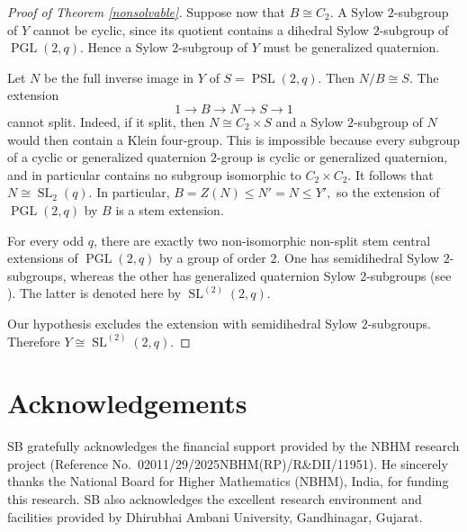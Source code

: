 \documentclass[preprint,11pt]{elsarticle}
\begin{document}
\begin{proof}[Proof of Theorem \ref{nonsolvable}]
	Suppose now that $
	B\cong C_2.$ 
	A Sylow $2$-subgroup of $Y$ cannot be cyclic, since its quotient
	contains a dihedral Sylow $2$-subgroup of
	$\operatorname{PGL}(2,q)$.  Hence a Sylow $2$-subgroup of $Y$
	must be generalized quaternion.
	
	Let $N$ be the full inverse image in $Y$ of
$
S=\operatorname{PSL}(2,q).
$
	Then
$
	N/B\cong S.
$
	The extension
	\[
	1\longrightarrow B
	\longrightarrow N
	\longrightarrow S
	\longrightarrow1
	\]
	cannot split.  Indeed, if it split, then
$
	N\cong C_2\times S
$
and a Sylow $2$-subgroup of $N$ would then contain a Klein
	four-group.  This is impossible because every subgroup of a
	cyclic or generalized quaternion $2$-group is cyclic or
	generalized quaternion, and in particular contains no subgroup
	isomorphic to $C_2\times C_2$.
	It follows that
$
	N\cong\operatorname{SL}_2(q).
$
	In particular,
$
	B=Z(N)\leq N'=N\leq Y',
$
	so the extension of $\operatorname{PGL}(2,q)$ by $B$ is a stem
	extension.
	
	For every odd $q$, there are exactly two non-isomorphic
	non-split stem central extensions of
	$\operatorname{PGL}(2,q)$ by a group of order $2$.  One has
	semidihedral Sylow $2$-subgroups, whereas the other has
	generalized quaternion Sylow $2$-subgroups (see
	\cite[Result~2.21]{GiuliettiKorchmaros}).  The latter is denoted
	here by  $\operatorname{SL}^{(2)}(2,q).$

	Our hypothesis excludes the extension with semidihedral Sylow
	$2$-subgroups.  Therefore
$
	Y\cong \operatorname{SL}^{(2)}(2,q).$
	\end{proof}














 









\section*{Acknowledgements} 
SB gratefully acknowledges the financial support provided by the NBHM research project (Reference No.~02011/29/2025NBHM(RP)/R\&DII/11951). He sincerely thanks the National Board for Higher Mathematics (NBHM), India, for funding this research. SB also acknowledges the excellent research environment and facilities provided by Dhirubhai Ambani University, Gandhinagar, Gujarat. 
\end{document}
